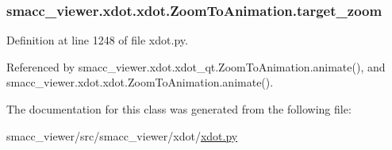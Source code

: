 \subsubsection[{\texorpdfstring{target\+\_\+zoom}{target_zoom}}]{\setlength{\rightskip}{0pt plus 5cm}smacc\+\_\+viewer.\+xdot.\+xdot.\+Zoom\+To\+Animation.\+target\+\_\+zoom}\hypertarget{classsmacc__viewer_1_1xdot_1_1xdot_1_1ZoomToAnimation_aef95c13584eeffb5d9028c376dc9fd4b}{}\label{classsmacc__viewer_1_1xdot_1_1xdot_1_1ZoomToAnimation_aef95c13584eeffb5d9028c376dc9fd4b}


Definition at line 1248 of file xdot.\+py.



Referenced by smacc\+\_\+viewer.\+xdot.\+xdot\+\_\+qt.\+Zoom\+To\+Animation.\+animate(), and smacc\+\_\+viewer.\+xdot.\+xdot.\+Zoom\+To\+Animation.\+animate().



The documentation for this class was generated from the following file\+:\begin{DoxyCompactItemize}
\item 
smacc\+\_\+viewer/src/smacc\+\_\+viewer/xdot/\hyperlink{xdot_8py}{xdot.\+py}\end{DoxyCompactItemize}

